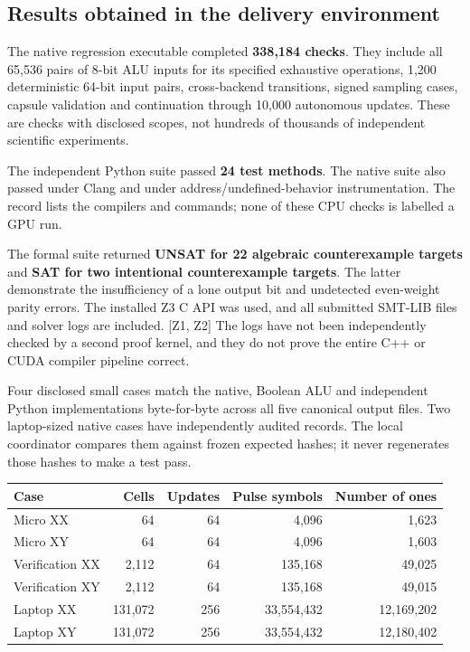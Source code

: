 \documentclass[11pt,a4paper]{article}
\begin{document}
\subsection{Results obtained in the delivery
environment}\label{results-obtained-in-the-delivery-environment}

The native regression executable completed \textbf{338,184 checks}. They
include all 65,536 pairs of 8-bit ALU inputs for its specified
exhaustive operations, 1,200 deterministic 64-bit input pairs,
cross-backend transitions, signed sampling cases, capsule validation and
continuation through 10,000 autonomous updates. These are checks with
disclosed scopes, not hundreds of thousands of independent scientific
experiments.

The independent Python suite passed \textbf{24 test methods}. The native
suite also passed under Clang and under address/undefined-behavior
instrumentation. The record lists the compilers and commands; none of
these CPU checks is labelled a GPU run.

The formal suite returned \textbf{UNSAT for 22 algebraic counterexample
targets} and \textbf{SAT for two intentional counterexample targets}.
The latter demonstrate the insufficiency of a lone output bit and
undetected even-weight parity errors. The installed Z3 C API was used,
and all submitted SMT-LIB files and solver logs are included. {[}Z1,
Z2{]} The logs have not been independently checked by a second proof
kernel, and they do not prove the entire C++ or CUDA compiler pipeline
correct.

Four disclosed small cases match the native, Boolean ALU and independent
Python implementations byte-for-byte across all five canonical output
files. Two laptop-sized native cases have independently audited records.
The local coordinator compares them against frozen expected hashes; it
never regenerates those hashes to make a test pass.

\begin{longtable}[]{@{}lrrrr@{}}
\toprule\noalign{}
Case & Cells & Updates & Pulse symbols & Number of ones \\
\midrule\noalign{}
\endhead
\bottomrule\noalign{}
\endlastfoot
Micro XX & 64 & 64 & 4,096 & 1,623 \\
Micro XY & 64 & 64 & 4,096 & 1,603 \\
Verification XX & 2,112 & 64 & 135,168 & 49,025 \\
Verification XY & 2,112 & 64 & 135,168 & 49,015 \\
Laptop XX & 131,072 & 256 & 33,554,432 & 12,169,202 \\
Laptop XY & 131,072 & 256 & 33,554,432 & 12,180,402 \\
\end{longtable}
\end{document}
